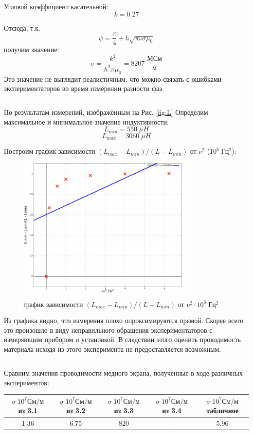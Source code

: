 \documentclass[11pt]{article}
\begin{document}
Угловой коэффициент касательной:
\[ k = 0.27 \]

Отсюда, т.к.
\[ \psi = \frac{\pi}{4} + h\sqrt{\pi\nu\sigma\mu_0}\]
получим значение:
\[ \sigma = \frac{k^2}{h^2\pi\mu_0} = 8207\; \frac{МСм}{м}\]
Это значение не выглядит реалистичным, что можно связать с ошибками экспериментаторов во время
измерении разности фаз.

\subsection{} \label{sigma_4}
По результатам измерений, изображённым на Рис. \ref{fig:L} Определим максимальное и минимальное значение индуктивности:
\[ L_{min} = 550\; \mu H \]
\[ L_{max} = 3060\; \mu H \]

Построим график зависимости \( (L_{max} - L_{min})/(L - L_{min}) \) от \(\nu^2\) (\(10^6\; Гц^2\)):
\begin{figure}[H]
    \centering
    \includegraphics[width=0.8\textwidth]{L.png}
    \caption{график зависимости \( (L_{max} - L_{min})/(L - L_{min})\) от \(\nu^2 \cdot 10^6\; Гц^2\) \)}
\end{figure}

Из графика видно, что измерения плохо опроксимируются прямой. Скорее всего это произошло в виду
неправильного обращения экспериментаторов с измеряющим прибором и установкой. В следствии этого
оценить проводимость материала исходя из этого эксперимента не предоставляется возможным.

\subsection{}

Сравним значения проводимости медного экрана, полученные в ходе различных экспериментов:
\begin{table}[H]
    \centering
    \begin{tabular}{|c|c|c|c|c|}
        \hline
        \(\sigma\; 10^7 См/м\) из 3.1 & \(\sigma\; 10^7 См/м\) из 3.2  & \(\sigma\; 10^7 См/м\) из 3.3  & \(\sigma\; 10^7 См/м\) из 3.4&  \(\sigma\; 10^7 См/м\) табличное\\\hline
        1.36 & 6.75 & 820 & -- & 5.96  \\\hline
    \end{tabular}
\end{table}
\end{document}
